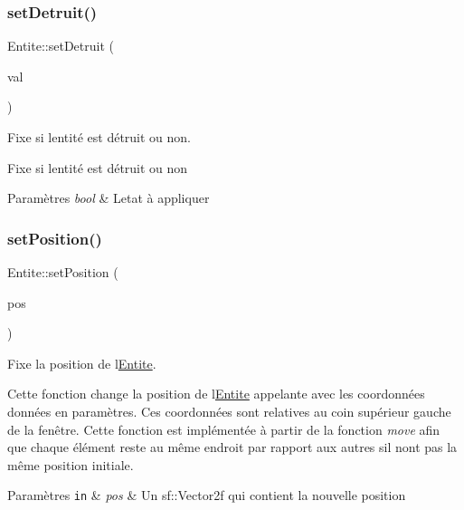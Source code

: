 \subsubsection{\texorpdfstring{set\+Detruit()}{setDetruit()}}
{\footnotesize\ttfamily Entite\+::set\+Detruit (\begin{DoxyParamCaption}\item[{bool}]{val }\end{DoxyParamCaption})}



Fixe si l\textquotesingle{}entité est détruit ou non. 

Fixe si l\textquotesingle{}entité est détruit ou non 
\begin{DoxyParams}{Paramètres}
{\em bool} & L\textquotesingle{}etat à appliquer \\
\hline
\end{DoxyParams}
\mbox{\label{class_entite_aa7fe4a7ebd8eb4c80ef9fdb7d97f2dad}} 
\subsubsection{\texorpdfstring{set\+Position()}{setPosition()}}
{\footnotesize\ttfamily Entite\+::set\+Position (\begin{DoxyParamCaption}\item[{const sf\+::\+Vector2f \&}]{pos }\end{DoxyParamCaption})}



Fixe la position de l\textquotesingle{}\hyperlink{class_entite}{Entite}. 

Cette fonction change la position de l\textquotesingle{}\hyperlink{class_entite}{Entite} appelante avec les coordonnées données en paramètres. Ces coordonnées sont relatives au coin supérieur gauche de la fenêtre. Cette fonction est implémentée à partir de la fonction {\itshape move} afin que chaque élément reste au même endroit par rapport aux autres s\textquotesingle{}il n\textquotesingle{}ont pas la même position initiale. 
\begin{DoxyParams}[1]{Paramètres}
\mbox{\tt in}  & {\em pos} & Un {\ttfamily sf\+::\+Vector2f} qui contient la nouvelle position \\
\hline
\end{DoxyParams}
\mbox{\label{class_entite_a8623ac815e34b553098f45696ea8918b}} 
